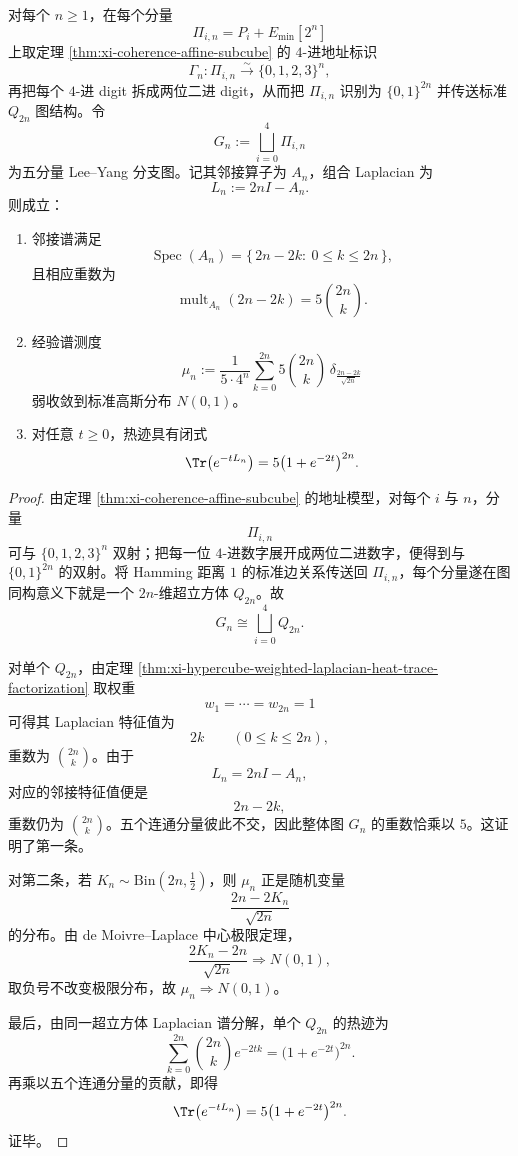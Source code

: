 \begin{theorem}\label{thm:xi-time-part62d-leyang-branch-graph-gaussian-spectrum}
对每个 \(n\ge 1\)，在每个分量
\[
\Pi_{i,n}=P_i+E_{\min}[2^n]
\]
上取定理 \ref{thm:xi-coherence-affine-subcube} 的 \(4\)-进地址标识
\[
\Gamma_n:\Pi_{i,n}\stackrel{\sim}{\longrightarrow}\{0,1,2,3\}^{n},
\]
再把每个 \(4\)-进 digit 拆成两位二进 digit，从而把 \(\Pi_{i,n}\) 识别为 \(\{0,1\}^{2n}\) 并传送标准 \(Q_{2n}\) 图结构。令
\[
G_n:=\bigsqcup_{i=0}^{4}\Pi_{i,n}
\]
为五分量 Lee--Yang 分支图。记其邻接算子为 \(A_n\)，组合 Laplacian 为
\[
L_n:=2nI-A_n.
\]
则成立：
\begin{enumerate}
  \item 邻接谱满足
  \[
  \operatorname{Spec}(A_n)=\{\,2n-2k:\ 0\le k\le 2n\,\},
  \]
  且相应重数为
  \[
  \operatorname{mult}_{A_n}(2n-2k)=5\binom{2n}{k}.
  \]
  \item 经验谱测度
  \[
  \mu_n:=
  \frac{1}{5\cdot 4^n}
  \sum_{k=0}^{2n}5\binom{2n}{k}\,
  \delta_{\frac{2n-2k}{\sqrt{2n}}}
  \]
  弱收敛到标准高斯分布 \(N(0,1)\)。
  \item 对任意 \(t\ge 0\)，热迹具有闭式
  \[
  \Tr\bigl(e^{-tL_n}\bigr)=5\bigl(1+e^{-2t}\bigr)^{2n}.
  \]
\end{enumerate}
\end{theorem}
\begin{proof}
由定理 \ref{thm:xi-coherence-affine-subcube} 的地址模型，对每个 \(i\) 与 \(n\)，分量
\[
\Pi_{i,n}
\]
可与 \(\{0,1,2,3\}^{n}\) 双射；把每一位 \(4\)-进数字展开成两位二进数字，便得到与 \(\{0,1\}^{2n}\) 的双射。将 Hamming 距离 \(1\) 的标准边关系传送回 \(\Pi_{i,n}\)，每个分量遂在图同构意义下就是一个 \(2n\)-维超立方体 \(Q_{2n}\)。故
\[
G_n\cong \bigsqcup_{i=0}^{4}Q_{2n}.
\]

对单个 \(Q_{2n}\)，由定理 \ref{thm:xi-hypercube-weighted-laplacian-heat-trace-factorization} 取权重
\[
w_1=\cdots=w_{2n}=1
\]
可得其 Laplacian 特征值为
\[
2k\qquad(0\le k\le 2n),
\]
重数为 \(\binom{2n}{k}\)。由于
\[
L_n=2nI-A_n,
\]
对应的邻接特征值便是
\[
2n-2k,
\]
重数仍为 \(\binom{2n}{k}\)。五个连通分量彼此不交，因此整体图 \(G_n\) 的重数恰乘以 \(5\)。这证明了第一条。

对第二条，若 \(K_n\sim \mathrm{Bin}(2n,\tfrac12)\)，则 \(\mu_n\) 正是随机变量
\[
\frac{2n-2K_n}{\sqrt{2n}}
\]
的分布。由 de Moivre--Laplace 中心极限定理，
\[
\frac{2K_n-2n}{\sqrt{2n}}\Longrightarrow N(0,1),
\]
取负号不改变极限分布，故 \(\mu_n\Longrightarrow N(0,1)\)。

最后，由同一超立方体 Laplacian 谱分解，单个 \(Q_{2n}\) 的热迹为
\[
\sum_{k=0}^{2n}\binom{2n}{k}e^{-2tk}
=
\bigl(1+e^{-2t}\bigr)^{2n}.
\]
再乘以五个连通分量的贡献，即得
\[
\Tr\bigl(e^{-tL_n}\bigr)=5\bigl(1+e^{-2t}\bigr)^{2n}.
\]
证毕。
\end{proof}

